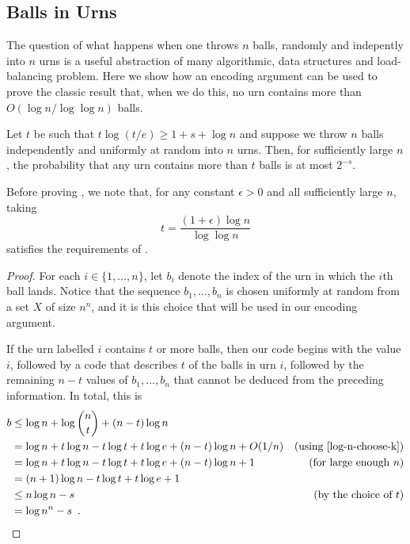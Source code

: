 \documentclass{patmorin}
\begin{document}
\subsection{Balls in Urns}

The question of what happens when one throws $n$ balls, randomly and
indepently into $n$ urns is a useful abstraction of many algorithmic,
data structures and load-balancing problem.  Here we show how an encoding
argument can be used to prove the classic result that, when we do this,
no urn contains more than $O(\log n/\log\log n)$ balls.

\begin{thm}
  Let $t$ be such that $t\log(t/e) \ge 1+s+\log n$ and suppose we throw
  $n$ balls independently and uniformly at random into $n$ urns. Then,
  for sufficiently large $n$, the probability that any urn contains more 
  than $t$ balls is at most $2^{-s}$.
\end{thm}

Before proving , we note that, for any constant $\epsilon
>0$ and all sufficiently large $n$, taking
\[
   t = \frac{(1+\epsilon)\log n}{\log\log n}
\] 
satisfies the requirements of .

\begin{proof}
  For each $i\in\{1,\ldots,n\}$, let $b_i$ denote the index of the urn in
  which the $i$th ball lands. Notice that the sequence $b_1,\ldots,b_n$
  is chosen uniformly at random from a set $X$ of size $n^n$, and it is this
  choice that will be used in our encoding argument.

  If the urn labelled $i$ contains $t$ or more balls, then our code
  begins with the value $i$, followed by a code that describes $t$ of
  the balls in urn $i$, followed by the remaining $n-t$ values of
  $b_1,\ldots,b_n$ that cannot be deduced from the preceding
  information.  In total, this is
  \begin{align*}
    b &\le \log n + \log\binom{n}{t} 
           + (n-t)\log n \\
     & = \log n + t\log n - t\log t + t\log e  
           + (n-t)\log n + O(1/n)
             & \text{(using \eqref{log-n-choose-k})} \\
     & = \log n + t\log n - t\log t + t\log e  
           + (n-t)\log n + 1
             & \text{(for large enough $n$)} \\
     & = (n+1)\log n - t\log t + t\log e + 1 \\
     & \le  n\log n - s &\text{(by the choice of $t$)} \\
     & =  \log n^n - s \enspace . & \qedhere
  \end{align*}
\end{proof}
\end{document}
